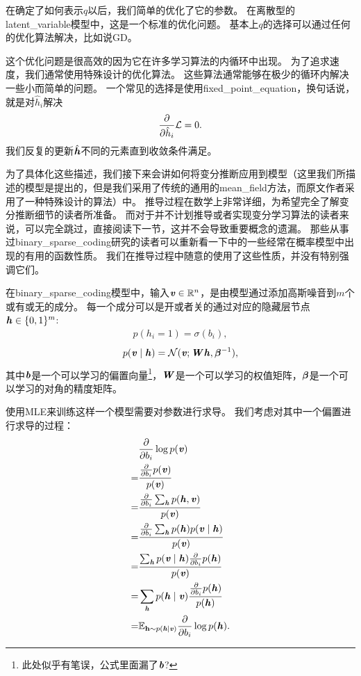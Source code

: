 在确定了如何表示$q$以后，我们简单的优化了它的参数。
在离散型的\gls{latent_variable}模型中，这是一个标准的优化问题。
基本上$q$的选择可以通过任何的优化算法解决，比如说\gls{GD}。


这个优化问题是很高效的因为它在许多学习算法的内循环中出现。
为了追求速度，我们通常使用特殊设计的优化算法。
这些算法通常能够在极少的循环内解决一些小而简单的问题。
一个常见的选择是使用\gls{fixed_point_equation}，换句话说，就是对$\hat{h}_i$解决
\begin{align}
	\frac{\partial}{\partial \hat{h}_i}\mathcal{L} = 0.
\end{align}
我们反复的更新$\hat{\boldsymbol{\mathit{h}}}$不同的元素直到收敛条件满足。


为了具体化这些描述，我们接下来会讲如何将变分推断应用到模型（这里我们所描述的模型是\citet{henniges2010binary}提出的，但是我们采用了传统的通用的\gls{mean_field}方法，而原文作者采用了一种特殊设计的算法）中。
推导过程在数学上非常详细，为希望完全了解变分推断细节的读者所准备。
而对于并不计划推导或者实现变分学习算法的读者来说，可以完全跳过，直接阅读下一节，这并不会导致重要概念的遗漏。
那些从事过\gls{binary_sparse_coding}研究的读者可以重新看一下中的一些经常在概率模型中出现的有用的函数性质。
我们在推导过程中随意的使用了这些性质，并没有特别强调它们。


在\gls{binary_sparse_coding}模型中，输入$\boldsymbol{\mathit{v}}\in\mathbb{R}^n$，是由模型通过添加高斯噪音到$m$个或有或无的成分。
每一个成分可以是开或者关的通过对应的隐藏层节点$\boldsymbol{\mathit{h}} \in\{0,1\}^m$:
\begin{align}
	p(h_i = 1) = \sigma(b_i),
\end{align}
\begin{align}
	p(\boldsymbol{\mathit{v}}\mid\boldsymbol{\mathit{h}}) = \mathcal{N}(\boldsymbol{\mathit{v}};\boldsymbol{\mathit{W}} \boldsymbol{\mathit{h}},{\boldsymbol{\beta}}^{-1}),
\end{align}
其中$\boldsymbol{\mathit{b}}$是一个可以学习的偏置向量\footnote{此处似乎有笔误，公式里面漏了$\boldsymbol{\mathit{b}}$?}，$\boldsymbol{\mathit{W}}$是一个可以学习的权值矩阵，${\boldsymbol{\beta}}$是一个可以学习的对角的精度矩阵。


使用\gls{MLE}来训练这样一个模型需要对参数进行求导。
我们考虑对其中一个偏置进行求导的过程：
\begin{align}
		& \frac{\partial}{\partial b_i} \log p(\boldsymbol{\mathit{v}}) \\
		= &  \frac{\frac{\partial}{\partial b_i} p(\boldsymbol{\mathit{v}})}{p(\boldsymbol{\mathit{v}})}\\
		= & \frac{\frac{\partial}{\partial b_i} \sum_{\boldsymbol{\mathit{h}}}^{} p(\boldsymbol{\mathit{h}},\boldsymbol{\mathit{v}})}{p(\boldsymbol{\mathit{v}})}\\
		= &  \frac{\frac{\partial}{\partial b_i} \sum_{\boldsymbol{\mathit{h}}}^{} p(\boldsymbol{\mathit{h}}) p(\boldsymbol{\mathit{v}}\mid \boldsymbol{\mathit{h}})  }{p(\boldsymbol{\mathit{v}})}\\
		= &  \frac{ \sum_{\boldsymbol{\mathit{h}}}^{}  p(\boldsymbol{\mathit{v}}\mid \boldsymbol{\mathit{h}}) \frac{\partial}{\partial b_i} p(\boldsymbol{\mathit{h}}) }{p(\boldsymbol{\mathit{v}})}\\
		= &  \sum_{\boldsymbol{\mathit{h}}}^{}  p(\boldsymbol{\mathit{h}}\mid \boldsymbol{\mathit{v}}) \frac{  \frac{\partial}{\partial b_i} p(\boldsymbol{\mathit{h}}) }{p(\boldsymbol{\mathit{h}})}\\
		= & \mathbb{E}_{\mathbf{h}\sim p(\boldsymbol{\mathit{h}}\mid\boldsymbol{\mathit{v}})} \frac{\partial}{\partial b_i}\log p(\boldsymbol{\mathit{h}}).
\end{align}

